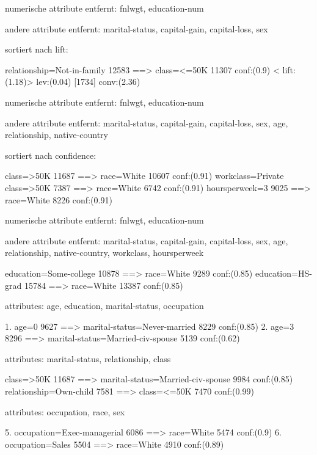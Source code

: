 
numerische attribute entfernt: fnlwgt, education-num

andere attribute entfernt: marital-status, capital-gain, capital-loss, sex


sortiert nach lift: 

relationship=Not-in-family 12583 ==> class=<=50K 11307    conf:(0.9) < lift:(1.18)> lev:(0.04) [1734] conv:(2.36)



numerische attribute entfernt: fnlwgt, education-num

andere attribute entfernt: marital-status, capital-gain, capital-loss, sex, age, relationship, native-country

sortiert nach confidence:

class=>50K 11687 ==> race=White 10607    conf:(0.91)
workclass=Private class=>50K 7387 ==> race=White 6742    conf:(0.91)
hoursperweek=3 9025 ==> race=White 8226    conf:(0.91)


numerische attribute entfernt: fnlwgt, education-num

andere attribute entfernt: marital-status, capital-gain, capital-loss, sex, age, relationship, native-country, workclass, hoursperweek


education=Some-college 10878 ==> race=White 9289    conf:(0.85)
education=HS-grad 15784 ==> race=White 13387    conf:(0.85)


attributes: age, education, marital-status, occupation

1. age=0 9627 ==> marital-status=Never-married 8229    conf:(0.85)
2. age=3 8296 ==> marital-status=Married-civ-spouse 5139    conf:(0.62)


attributes: marital-status, relationship, class

class=>50K 11687 ==> marital-status=Married-civ-spouse 9984    conf:(0.85)
 relationship=Own-child 7581 ==> class=<=50K 7470    conf:(0.99)

attributes: occupation, race, sex

5. occupation=Exec-managerial 6086 ==> race=White 5474    conf:(0.9)
6. occupation=Sales 5504 ==> race=White 4910    conf:(0.89)


